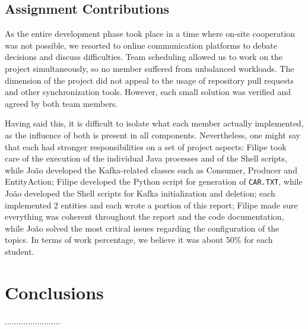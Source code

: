 \documentclass[12pt]{article}
\begin{document}
\subsection{Assignment Contributions} %

As the entire development phase took place in a time where on-site cooperation was not possible, we resorted to online communication platforms to debate decisions
and discuss difficulties.
Team scheduling allowed us to work on the project simultaneously, so no member suffered from unbalanced workloads.
The dimension of the project did not appeal to the usage of repository pull requests and other synchronization tools.
However, each small solution was verified and agreed by both team members.

Having said this, it is difficult to isolate what each member actually implemented, as the influence of both is present in all components.
Nevertheless, one might say that each had stronger responsibilities on a set of project aspects:
Filipe took care of the execution of the individual Java processes and of the Shell scripts, while João developed the Kafka-related classes such as Consumer,
Producer and EntityAction; Filipe developed the Python script for generation of \texttt{CAR.TXT}, while João developed the Shell scripts for Kafka initialization 
and deletion; each implemented 2 entities and each wrote a portion of this report; Filipe made sure everything was coherent throughout the report and the code 
documentation, while João solved the most critical issues regarding the configuration of the topics.
In terms of work percentage, we believe it was about 50\% for each student.

\newpage
\section*{Conclusions} %

........................
\end{document}

